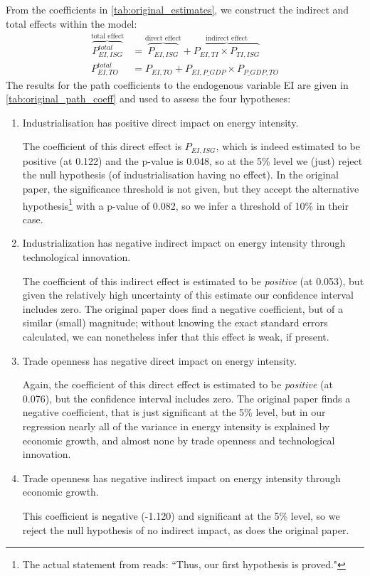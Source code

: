 \documentclass[11pt,a4paper]{article}
\begin{document}
From the coefficients in \cref{tab:original_estimates}, we construct the indirect and total effects within the model:
\begin{align}
\overbrace{P^{total}_{EI,ISG}}^\text{total effect} &=  
\overbrace{P_{EI,ISG}}^\text{direct effect} + 
\overbrace{P_{EI,TI} \times P_{TI,ISG}}^\text{indirect effect} \\
P^{total}_{EI,TO} &=  
P_{EI,TO} + 
P_{EI,P\_GDP} \times P_{P\_GDP,TO}
\end{align}
The results for the path coefficients to the endogenous variable EI are given in \cref{tab:original_path_coeff} and used to assess the four hypotheses:

\begin{enumerate}[label=\textbf{H.\arabic*}]
\item Industrialisation has positive direct impact on energy intensity.

The coefficient of this direct effect is $P_{EI,ISG}$, which is indeed estimated to be positive (at 0.122) and the p-value is 0.048, so at the 5\% level we (just) reject the null hypothesis (of industrialisation having no effect).
In the original paper, the significance threshold is not given, but they accept the alternative hypothesis\footnote{
The actual statement from \cite{panHowIndustrializationTrade2019} reads: ``Thus, our first hypothesis is proved."
} with a p-value of 0.082, so we infer a threshold of 10\% in their case.

\item Industrialization has negative indirect impact on energy intensity through technological innovation.

The coefficient of this indirect effect is estimated to be \emph{positive} (at 0.053), but given the relatively high uncertainty of this estimate our confidence interval includes zero.
The original paper does find a negative coefficient, but of a similar (small) magnitude; without knowing the exact standard errors calculated, we can nonetheless infer that this effect is weak, if present.

\item Trade openness has negative direct impact on energy intensity.

Again, the coefficient of this direct effect is estimated to be \emph{positive} (at 0.076), but the confidence interval includes zero.
The original paper finds a negative coefficient, that is just significant at the 5\% level, but in our regression nearly all of the variance in energy intensity is explained by economic growth, and almost none by trade openness and technological innovation. 

\item Trade openness has negative indirect impact on energy intensity through economic growth.

This coefficient is negative (-1.120) and significant at the 5\% level, so we reject the null hypothesis of no indirect impact, as does the original paper.

\end{enumerate}
\end{document}
